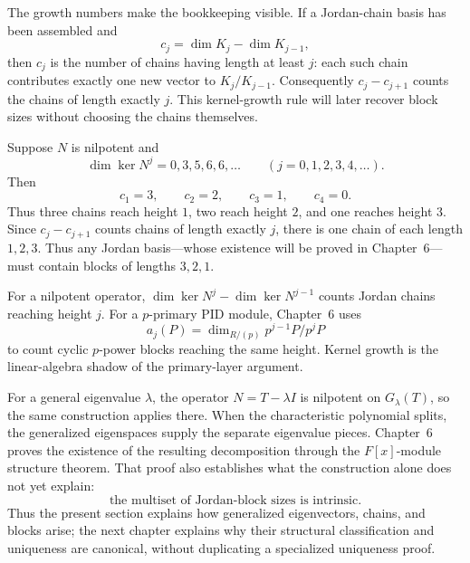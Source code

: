 The growth numbers make the bookkeeping visible.  If a Jordan-chain basis
has been assembled and
\[
c_j=\dim K_j-\dim K_{j-1},
\]
then \(c_j\) is the number of chains having length at least \(j\):
each such chain contributes exactly one new vector to \(K_j/K_{j-1}\).
Consequently \(c_j-c_{j+1}\) counts the chains of length exactly \(j\).
This kernel-growth rule will later recover block sizes without choosing the
chains themselves.

\begin{example}
Suppose \(N\) is nilpotent and
\[
\dim\ker N^j=0,3,5,6,6,\ldots\qquad(j=0,1,2,3,4,\ldots).
\]
Then
\[
c_1=3,\qquad c_2=2,\qquad c_3=1,\qquad c_4=0.
\]
Thus three chains reach height \(1\), two reach height \(2\), and one reaches
height \(3\). Since \(c_j-c_{j+1}\) counts chains of length exactly \(j\),
there is one chain of each length \(1,2,3\). Thus any Jordan basis---whose
existence will be proved in Chapter~6---must contain blocks of lengths
\(3,2,1\).
\end{example}

\begin{remark}
For a nilpotent operator,
\(\dim\ker N^j-\dim\ker N^{j-1}\) counts Jordan chains reaching height \(j\).
For a \(p\)-primary PID module, Chapter~6 uses
\[
a_j(P)=\dim_{R/(p)}p^{j-1}P/p^jP
\]
to count cyclic \(p\)-power blocks reaching the same height. Kernel growth
is the linear-algebra shadow of the primary-layer argument.
\end{remark}

For a general eigenvalue \(\lambda\), the operator
\(N=T-\lambda I\) is nilpotent on \(G_\lambda(T)\), so the same construction
applies there.  When the characteristic polynomial splits, the generalized
eigenspaces supply the separate eigenvalue pieces.  Chapter~6 proves the
existence of the resulting decomposition through the \(F[x]\)-module
structure theorem.  That proof also establishes what the construction alone
does not yet explain:
\[
\boxed{\text{the multiset of Jordan-block sizes is intrinsic}.}
\]
Thus the present section explains how generalized eigenvectors, chains, and
blocks arise; the next chapter explains why their structural classification
and uniqueness are canonical, without duplicating a specialized uniqueness
proof.



